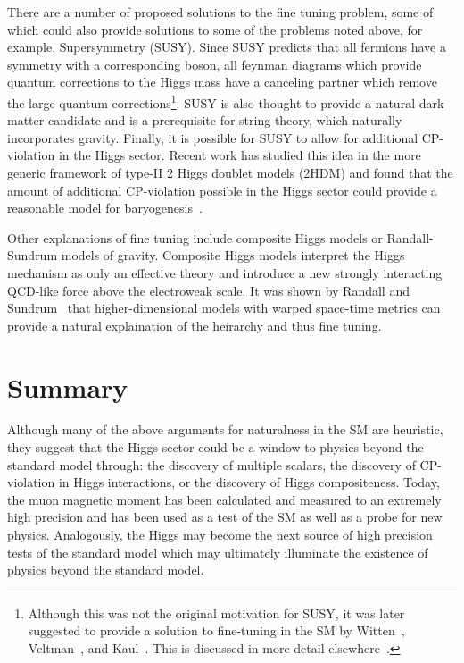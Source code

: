 There are a 
number of proposed solutions to the fine tuning problem, some 
of which 
could also provide solutions to some of the problems noted above,
for example, Supersymmetry (SUSY).  
Since SUSY predicts that all fermions have a symmetry with a 
corresponding boson, 
all feynman diagrams which provide quantum corrections to the Higgs 
mass have a canceling partner which remove the large quantum 
corrections\footnote{Although this was not the original motivation
for SUSY, it was later suggested to provide a solution to 
fine-tuning in the SM by Witten~\cite{Witten:1981nf}, 
Veltman~\cite{Veltman:1980mj}, and Kaul~\cite{Kaul:1981wp}.  
This is discussed in more detail elsewhere~\cite{Aitchison:2007}. }.
SUSY is also thought to provide a natural dark matter candidate and
is a prerequisite for string theory, which naturally incorporates 
gravity.  Finally, it is possible 
for SUSY to allow for additional CP-violation in the Higgs sector.
Recent work has studied this idea in the more generic framework of
type-II 2 Higgs doublet models (2HDM) and found that the amount of
additional CP-violation possible in the Higgs sector could provide
a reasonable model for baryogenesis~\cite{Shu:2013uua}.  

Other explanations of fine tuning include composite Higgs models
or Randall-Sundrum models of gravity.  Composite Higgs models 
interpret the Higgs mechanism as only an effective theory and
introduce a new strongly interacting QCD-like force above the 
electroweak scale.  It was shown by Randall and 
Sundrum~\cite{Randall:1999ee} that
higher-dimensional models with warped space-time metrics can 
provide a natural explaination of the heirarchy and thus fine
tuning.

\section{Summary}

Although many of the above arguments for naturalness in the SM 
are heuristic, they suggest that the Higgs sector could be a 
window to physics beyond
the standard model through: the discovery of multiple scalars,
the discovery of CP-violation in Higgs interactions,
or the discovery of Higgs compositeness.  Today, the muon 
magnetic moment has been calculated and measured 
to an extremely high precision and has been used as a 
test of the SM as well as a probe for new physics.
Analogously, the Higgs may become the next source of high 
precision tests of the standard model which may
ultimately illuminate the existence of physics beyond the 
standard model.  

